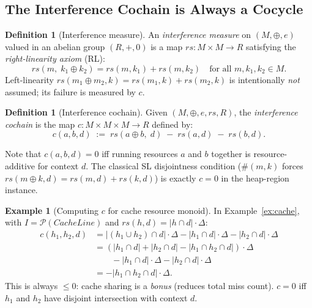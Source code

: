 \documentclass[acmsmall,sigplan,anonymous,review,screen]{acmart}
\theoremstyle{plain}
\theoremstyle{definition}
\newtheorem{definition}[theorem]{Definition}
\newtheorem{example}[theorem]{Example}
\newcommand{\rs}{\mathit{rs}}
\begin{document}
\subsection{The Interference Cochain is Always a Cocycle}
\label{sec:background:cocycle}

\begin{definition}[Interference measure]
\label{def:rs}
  An \emph{interference measure} on $(M, \oplus, e)$ valued in an
  abelian group $(R, +, 0)$ is a map $\rs : M \times M \to R$
  satisfying the \emph{right-linearity axiom} (RL):
  \[
    \rs(m,\; k_1 \oplus k_2) = \rs(m, k_1) + \rs(m, k_2)
    \quad \text{for all } m, k_1, k_2 \in M. \tag{RL}
  \]
  Left-linearity $\rs(m_1 \oplus m_2, k) = \rs(m_1, k) + \rs(m_2, k)$
  is intentionally \emph{not} assumed; its failure is measured by $c$.
\end{definition}

\begin{definition}[Interference cochain]
\label{def:cochain}
  Given $(M, \oplus, e, \rs, R)$, the \emph{interference cochain}
  is the map $c : M \times M \times M \to R$ defined by:
  \[
    c(a, b, d) \;:=\; \rs(a \oplus b,\; d) \;-\; \rs(a, d) \;-\; \rs(b, d).
  \]
\end{definition}

Note that $c(a, b, d) = 0$ iff running resources $a$ and $b$ together is
resource-additive for context $d$.  The classical SL disjointness condition
($\#(m, k)$ forces $\rs(m \oplus k, d) = \rs(m, d) + \rs(k, d)$) is exactly
$c = 0$ in the heap-region instance.

\begin{example}[Computing $c$ for cache resource monoid]
\label{ex:cache-c}
  In Example~\ref{ex:cache}, with $I = \mathcal{P}(\mathit{CacheLine})$
  and $\rs(h, d) = |h \cap d| \cdot \Delta$:
  \begin{align*}
    c(h_1, h_2, d) &= |(h_1 \cup h_2) \cap d| \cdot \Delta
                      - |h_1 \cap d| \cdot \Delta - |h_2 \cap d| \cdot \Delta \\
    &= (|h_1 \cap d| + |h_2 \cap d| - |h_1 \cap h_2 \cap d|) \cdot \Delta \\
    &\quad\quad - |h_1 \cap d| \cdot \Delta - |h_2 \cap d| \cdot \Delta \\
    &= -|h_1 \cap h_2 \cap d| \cdot \Delta.
  \end{align*}
  This is always $\leq 0$: cache sharing is a \emph{bonus} (reduces total
  miss count).  $c = 0$ iff $h_1$ and $h_2$ have disjoint intersection
  with context $d$.
\end{example}
\end{document}
